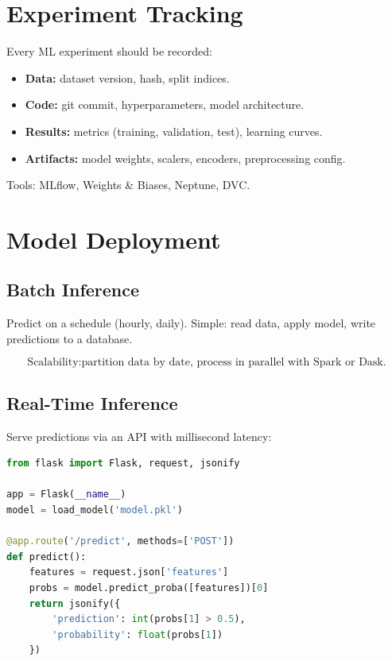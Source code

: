 \section{Experiment Tracking}

Every ML experiment should be recorded:

\begin{itemize}
	\item \textbf{Data:} dataset version, hash, split indices.
	\item \textbf{Code:} git commit, hyperparameters, model architecture.
	\item \textbf{Results:} metrics (training, validation, test), learning curves.
	\item \textbf{Artifacts:} model weights, scalers, encoders, preprocessing config.
\end{itemize}

Tools: MLflow, Weights \& Biases, Neptune, DVC.

\section{Model Deployment}

\subsection{Batch Inference}

Predict on a schedule (hourly, daily). Simple: read data, apply model, write predictions to a database.

\[
	\text{Scalability:} \text{partition data by date, process in parallel with Spark or Dask.}
\]

\subsection{Real-Time Inference}

Serve predictions via an API with millisecond latency:

\begin{lstlisting}[language=Python, caption=Real-time model serving outline]
from flask import Flask, request, jsonify

app = Flask(__name__)
model = load_model('model.pkl')

@app.route('/predict', methods=['POST'])
def predict():
    features = request.json['features']
    probs = model.predict_proba([features])[0]
    return jsonify({
        'prediction': int(probs[1] > 0.5),
        'probability': float(probs[1])
    })
\end{lstlisting}

